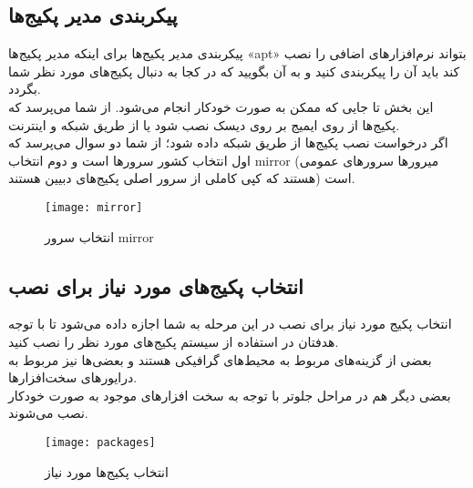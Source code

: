 \subsection{پیکربندی مدیر پکیج‌ها}
\begin{frame}{پیکربندی مدیر پکیج‌ها}
  برای اینکه مدیر پکیج‌ها «apt» بتواند نرم‌افزارهای اضافی را نصب کند باید آن را پیکربندی کنید و به آن بگویید که در کجا به دنبال پکیج‌های مورد نظر شما بگردد.\\
  این بخش تا جایی که ممکن به صورت خودکار انجام می‌شود. از شما می‌پرسد که پکیج‌ها از روی ایمیج بر روی دیسک نصب شود یا از طریق شبکه و اینترنت.\\
  اگر درخواست نصب پکیج‌ها از طریق شبکه داده شود؛ از شما دو سوال می‌پرسد که اول انتخاب کشور سرورها است و دوم انتخاب mirror (میرور‌ها سرورهای عمومی هستند که کپی کاملی از سرور اصلی پکیج‌های دبیین هستند) است.
  \begin{figure}
    \texttt{[image: mirror]}
    \caption{انتخاب سرور mirror~\cite{fig:deb_mirror}}
  \end{figure}
\end{frame}

\subsection{انتخاب پکیج‌های مورد نیاز برای نصب}
\begin{frame}{انتخاب پکیج مورد نیاز برای نصب}
  در این مرحله به شما اجازه داده می‌شود تا با توجه هدفتان در استفاده از سیستم پکیج‌های مورد نظر را نصب کنید.\\
  بعضی از گزینه‌های مربوط به محیط‌های گرافیکی هستند و بعضی‌ها نیز مربوط به درایورهای سخت‌افزارها.\\
  بعضی دیگر هم در مراحل جلوتر با توجه به سخت افزار‌های موجود به صورت خودکار نصب می‌شوند.\\
  \begin{figure}
    \texttt{[image: packages]}
    \caption{انتخاب پکیج‌ها مورد نیاز~\cite{fig:deb_packages}}
  \end{figure}
\end{frame}

